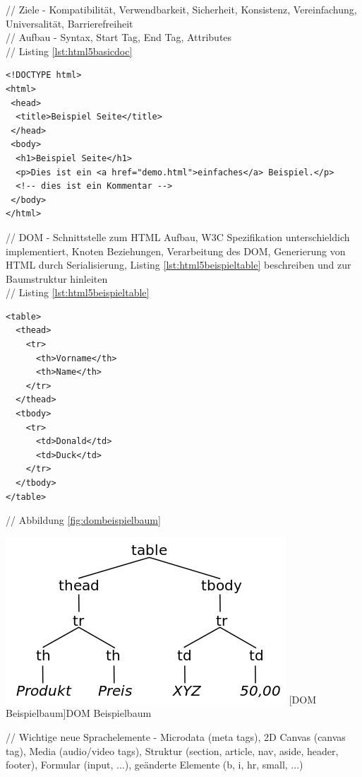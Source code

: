 \documentclass[12pt,a4paper,bibliography=totocnumbered,listof=totocnumbered]{scrartcl}
\begin{document}
// Ziele - Kompatibilität, Verwendbarkeit, Sicherheit, Konsistenz, Vereinfachung, Universalität, Barrierefreiheit\\
// Aufbau - Syntax, Start Tag, End Tag, Attributes\\
// Listing \ref{lst:html5basicdoc}
	\vspace{1em}
	\begin{lstlisting}[caption=HTML5 Basis Dokument, label=lst:html5basicdoc]
<!DOCTYPE html>
<html>
 <head>
  <title>Beispiel Seite</title>
 </head>
 <body>
  <h1>Beispiel Seite</h1>
  <p>Dies ist ein <a href="demo.html">einfaches</a> Beispiel.</p>
  <!-- dies ist ein Kommentar -->
 </body>
</html>
	\end{lstlisting}
	
// DOM - Schnittstelle zum HTML Aufbau, W3C Spezifikation unterschieldich implementiert, Knoten Beziehungen, Verarbeitung des DOM, Generierung von HTML durch Serialisierung, Listing \ref{lst:html5beispieltable} beschreiben und zur Baumstruktur hinleiten\\
// Listing \ref{lst:html5beispieltable}
	\vspace{1em}
	\begin{lstlisting}[caption=HTML5 Beispiel Definition, label=lst:html5beispieltable]
<table>
  <thead>
    <tr>
      <th>Vorname</th>
      <th>Name</th>
    </tr>
  </thead>
  <tbody>
    <tr>
      <td>Donald</td>
      <td>Duck</td>
    </tr>
  </tbody>
</table>
	\end{lstlisting}

// Abbildung \ref{fig:dombeispielbaum}\\
	\vspace{1em}
	\begin{minipage}{\linewidth}
		\centering
		\includegraphics[width=0.5\linewidth]{images/dom_sampletree.png}
		[DOM Beispielbaum]{DOM Beispielbaum}
		\label{fig:dombeispielbaum}
	\end{minipage}

// Wichtige neue Sprachelemente - Microdata (meta tags), 2D Canvas (canvas tag), Media (audio/video tags), Struktur (section, article, nav, aside, header, footer), Formular (input, ...), geänderte Elemente (b, i, hr, small, ...)\\
\end{document}
